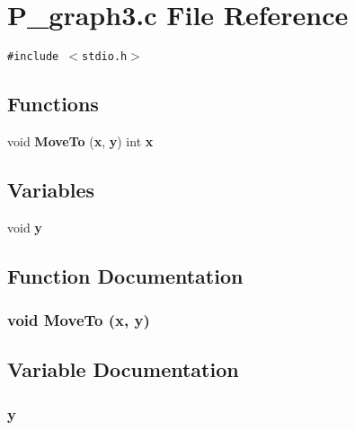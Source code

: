\section{P\_\-graph3.c File Reference}
\label{P__graph3_8c}
{\tt \#include $<$stdio.h$>$}\par
\subsection*{Functions}
\begin{CompactItemize}
\item 
void {\bf Move\-To} ({\bf x}, {\bf y}) int {\bf x}
\end{CompactItemize}
\subsection*{Variables}
\begin{CompactItemize}
\item 
void {\bf y}
\end{CompactItemize}


\subsection{Function Documentation}
\subsubsection{\setlength{\rightskip}{0pt plus 5cm}void Move\-To ({\bf x}, {\bf y})}\label{P__graph3_8c_a1}




\subsection{Variable Documentation}
\subsubsection{\setlength{\rightskip}{0pt plus 5cm}y}\label{P__graph3_8c_a0}



